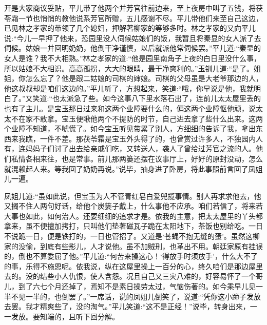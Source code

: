 \begin{parag}
    开是大家商议妥贴，平儿带了他两个并芳官往前边来，至上夜房中叫了五钱，将茯苓霜一节也悄悄的教他说系芳官所赠，五儿感谢不尽。平儿带他们来至自己这边，已见林之孝家的带领了几个媳妇，押解著柳家的等够多时。林之孝家的又向平儿说:“今儿一早押了他来，恐园里没人伺候姑娘们的饭，我暂且将秦显的女人派了去伺候。姑娘一并回明奶奶，他倒干净谨慎，以后就派他常伺候罢。”平儿道:“秦显的女人是谁？我不大相熟。”林之孝家的道:“他是园里南角子上夜的白日里没什么事，所以姑娘不大相识。高高孤拐，大大的眼睛，最干净爽利的。”玉钏儿道:“是了。姐姐，你怎么忘了？他是跟二姑娘的司棋的婶娘。司棋的父母虽是大老爷那边的人，他这叔叔却是咱们这边的。”平儿听了，方想起来，笑道:“哦，你早说是他，我就明白了。”又笑道:“也太派急了些。如今这事八下里水落石出了，连前儿太太屋里丢的也有了主儿。是宝玉那日过来和这两个业障要什么的，偏这两个业障怄他顽，说太太不在家不敢拿。宝玉便瞅他两个不提防的时节，自己进去拿了些什么出来。这两个业障不知道，不唬慌了。如今宝玉听见带累了别人，方细细的告诉了我，拿出东西来我瞧，一件不差。那茯苓霜是宝玉外头得了的，也曾赏过许多人，不独园内人有，连妈妈子们讨了出去给亲戚们吃，又转送人，袭人了曾给过芳官之流的人。他们私情各相来往，也是常事。前儿那两篓还摆在议事厅上，好好的原封没动，怎么就混赖起人来。等我回了奶奶再说。”说毕，抽身进了卧房，将此事照前言回了凤姐儿一遍。
\end{parag}


\begin{parag}
    凤姐儿道:“虽如此说，但宝玉为人不管青红皂白爱兜揽事情。别人再求求他去，他又搁不住人两句好话，给他个炭篓子戴上，什么事他不应承。咱们若信了，将来若大事也如此，如何治人。还要细细的追求才是。依我的主意，把太太屋里的丫头都拿来，虽不便擅加拷打，只叫他们垫著磁瓦子跪在太阳地下，茶饭也别给吃。一日不说跪一日，便是铁打的，一日也管招了。又道是‘苍蝇不抱无缝的蛋’。虽然这柳家的没偷，到底有些影儿，人才说他。虽不加贼刑，也革出不用。朝廷家原有挂误的，倒也不算委屈了他。”平儿道:“何苦来操这心！‘得放手时须放手’，什么大不了的事，乐得不施恩呢。依我说，纵在这屋里操上一百分的心，终久咱们是那边屋里去的。没的结些小人仇恨，使人含怨。况且自己又三灾八难的，好容易怀了一个哥儿，到了六七个月还掉了，焉知不是素日操劳太过，气恼伤著的。如今乘早儿见一半不见一半的，也倒罢了。”一席话，说的凤姐儿倒笑了，说道:“凭你这小蹄子发放去罢。我才精爽些了，没的淘气。”平儿笑道:“这不是正经！”说毕，转身出来，一一发放。要知端的，且听下回分解。
\end{parag}
